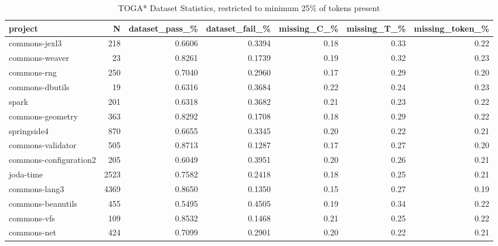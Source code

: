 \begin{table*}
\centering
\caption{TOGA* Dataset Statistics, restricted to minimum 25\% of tokens present}
\label{tab:toga_stats_25}
\begin{tabular}{lrrrrrr}
\toprule
                project &      N &  dataset\_pass\_\% &  dataset\_fail\_\% &  missing\_C\_\% &  missing\_T\_\% &  missing\_token\_\% \\
\midrule
          commons-jexl3 &    218 &          0.6606 &          0.3394 &         0.18 &         0.33 &             0.22 \\
         commons-weaver &     23 &          0.8261 &          0.1739 &         0.19 &         0.32 &             0.23 \\
            commons-rng &    250 &          0.7040 &          0.2960 &         0.17 &         0.29 &             0.20 \\
        commons-dbutils &     19 &          0.6316 &          0.3684 &         0.22 &         0.24 &             0.23 \\
                  spark &    201 &          0.6318 &          0.3682 &         0.21 &         0.23 &             0.22 \\
       commons-geometry &    363 &          0.8292 &          0.1708 &         0.18 &         0.29 &             0.22 \\
            springside4 &    870 &          0.6655 &          0.3345 &         0.20 &         0.22 &             0.21 \\
      commons-validator &    505 &          0.8713 &          0.1287 &         0.17 &         0.27 &             0.20 \\
 commons-configuration2 &    205 &          0.6049 &          0.3951 &         0.20 &         0.26 &             0.21 \\
              joda-time &   2523 &          0.7582 &          0.2418 &         0.18 &         0.25 &             0.21 \\
          commons-lang3 &   4369 &          0.8650 &          0.1350 &         0.15 &         0.27 &             0.19 \\
      commons-beanutils &    455 &          0.5495 &          0.4505 &         0.19 &         0.34 &             0.22 \\
            commons-vfs &    109 &          0.8532 &          0.1468 &         0.21 &         0.25 &             0.22 \\
            commons-net &    424 &          0.7099 &          0.2901 &         0.20 &         0.22 &             0.21 \\

\end{tabular}
\end{table*}
